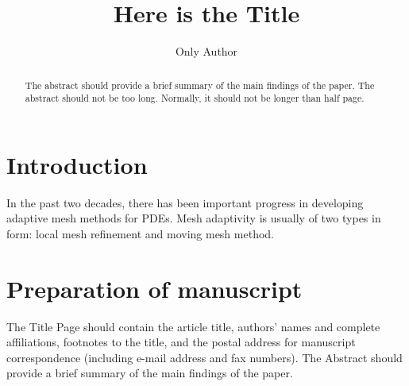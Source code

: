 \documentclass{eajam}
\begin{document}

\title{Here is the Title}

\author[Only Author]{Only Author\corrauth}
\address{School of Mathematical Sciences, Beijing International University,
Beijing 12345, China.}

%
%
%

\begin{abstract}
The abstract should provide a brief summary of the main findings of
the paper. The abstract should not be too long. Normally, it should
not be longer than half page.
\end{abstract}



\maketitle

\section{Introduction}
\label{sec1} In the past two decades, there has been important
progress in developing adaptive mesh methods for PDEs. Mesh
adaptivity is usually of two types in form: local mesh refinement
and moving mesh method.

\section{Preparation of manuscript}
\label{sec2} The Title Page should contain the article title,
authors' names and complete affiliations, footnotes to the title,
and the postal address for manuscript correspondence (including
e-mail address and fax numbers). The Abstract should provide a brief
summary of the main findings of the paper.
\end{document}
